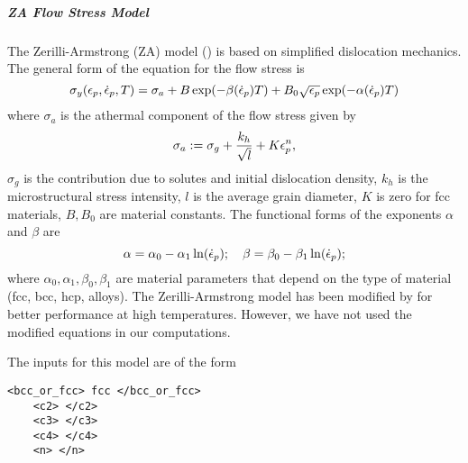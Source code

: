   \subparagraph{ZA Flow Stress Model}
  The Zerilli-Armstrong (ZA) model (\cite{Zerilli87,Zerilli93,Zerilli04})
  is based on simplified dislocation mechanics.  The general form of the
  equation for the flow stress is
  \begin{equation}
    \sigma_y(\Ep,\Epdot{},T) = 
      \sigma_a + B\exp(-\beta(\Epdot{}) T) + 
                           B_0\sqrt{\Ep}\exp(-\alpha(\Epdot{}) T)
  \end{equation}
  where $\sigma_a$ is the athermal component of the flow stress given by
  \begin{equation}
    \sigma_a := \sigma_g + \frac{k_h}{\sqrt{l}} + K\Ep^n,
  \end{equation}
  $\sigma_g$ is the contribution due to solutes and initial dislocation
  density, $k_h$ is the microstructural stress intensity, $l$ is the
  average grain diameter, $K$ is zero for fcc materials,
  $B, B_0$ are material constants.  The functional forms of the exponents
  $\alpha$ and $\beta$ are
  \begin{equation}
    \alpha = \alpha_0 - \alpha_1 \ln(\Epdot{}); \quad
    \beta = \beta_0 - \beta_1 \ln(\Epdot{}); 
  \end{equation}
  where $\alpha_0, \alpha_1, \beta_0, \beta_1$ are material parameters that
  depend on the type of material (fcc, bcc, hcp, alloys).  The Zerilli-Armstrong
  model has been modified by \cite{Abed05} for better performance at high
  temperatures.  However, we have not used the modified equations in our
  computations.

  The inputs for this model are of the form
  \begin{Verbatim}[fontsize=\footnotesize]
    <bcc_or_fcc> fcc </bcc_or_fcc>
    <c2> </c2>
    <c3> </c3>
    <c4> </c4>
    <n> </n>
  \end{Verbatim}

